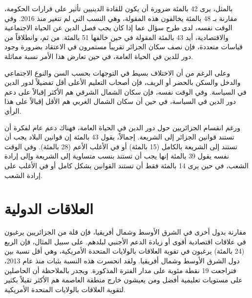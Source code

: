 \documentclass{article}
\begin{document}
 بالمثل، يرى 42 بالمئة ضرورة أن يكون للقادة الدينيين تأثير على قرارات الحكومة، مقارنة بـ 48 بالمئة يخالفون هذه المقولة، وهي النسب التي لم تتغير منذ 2016. وفي الوقت نفسه، لدى طرح سؤال عما إذا كان يجب فصل الدين عن الحياة الاجتماعية والاقتصادية، أيد 43 بالمئة المقولة في حين خالفها 51 بالمئة. من ثم، وانطلاقاً من قياسات متعددة، فإن نصف سكان الجزائر تقريباً مستمرون في الاعتقاد بضرورة وجود دور للدين في الحياة العامة، في حين تعارض هذا الأمر نسبة مماثلة.
	
 وعلى الرغم من أن الاختلاف بسيط في التوجهات بحسب السن والنوع الاجتماعي والدخل والسكن بالحضر أو الريف، فإن أصحاب التعليم الأعلى أقل تفضيلاً لدور الدين في السياسة. وفي الوقت نفسه، فإن سكان الشمال الشرقي هم الأكثر إقبالاً على دعم دور الدين في السياسة، في حين أن سكان الشمال الغربي هم الأقل إقبالاً على هذا الرأي.
	
 ورغم انقسام الجزائريين حول دور الدين في الحياة العامة، فهناك دعم عام لفكرة أن تستند قوانين الجزائر إلى الشريعة. إجمالاً، يقول 43 بالمئة إن قوانين البلاد يجب أن تستند إلى الشريعة بالكامل (15 بالمئة) أو في الأغلب الأعم (28 بالمئة). وفي الوقت نفسه يقول 39 بالمئة إنها يجب أن تستند بنسب متساوية إلى الشريعة وإلى إرادة الشعب، في حين يرى 14 بالمئة فقط أن تستند القوانين بشكل كامل أو في الأغلب على إرادة الشعب.

\section*{العلاقات الدولية}

 مقارنة بدول أخرى في الشرق الأوسط وشمال أفريقيا، فإن قلة من الجزائريين يرغبون في علاقات اقتصادية أقوى أو زيادة الدعم الأجنبي لبلدهم. على سبيل المثال، فإن الربع (24 بالمئة) يرغبون في تقوية العلاقات بالولايات المتحدة الأمريكية، وهي أقل نسبة بين دول الشرق الأوسط وشمال أفريقيا. ولقد انحسرت هذه النسبة بثبات منذ عام 2013، فتراجعت 19 نقطة مئوية على مدار الفترة المذكورة. ويجدر بالملاحظة أن الحاصلين على مستويات تعليمية أفضل ومن يعيشون خارج منطقة العاصمة هم الأكثر تقبلاً بكثير لتقوية العلاقات بالولايات المتحدة الأمريكية.
	
\end{document}
